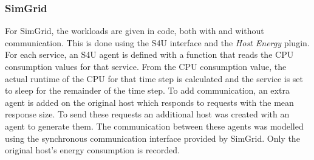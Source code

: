 \subsubsection{SimGrid}
For SimGrid, the workloads are given in code, both with and without communication. This is done using the S4U interface and the \textit{Host Energy} plugin. For each service, an S4U agent is defined with a function that reads the CPU consumption values for that service. From the CPU consumption value, the actual runtime of the CPU for that time step is calculated and the service is set to sleep for the remainder of the time step. To add communication, an extra agent is added on the original host which responds to requests with the mean response size. To send these requests an additional host was created with an agent to generate them. The communication between these agents was modelled using the synchronous communication interface provided by SimGrid. Only the original host's energy consumption is recorded.


